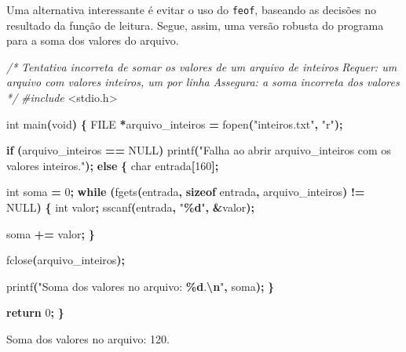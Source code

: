 \documentclass[
  11pt,
  a4paper,
]{scrbook}
\newenvironment{Shaded}{\begin{snugshade}}{\end{snugshade}}
\newcommand{\CommentTok}[1]{\textcolor[rgb]{0.56,0.35,0.01}{\textit{#1}}}
\newcommand{\ControlFlowTok}[1]{\textcolor[rgb]{0.13,0.29,0.53}{\textbf{#1}}}
\newcommand{\DataTypeTok}[1]{\textcolor[rgb]{0.13,0.29,0.53}{#1}}
\newcommand{\DecValTok}[1]{\textcolor[rgb]{0.00,0.00,0.81}{#1}}
\newcommand{\ImportTok}[1]{#1}
\newcommand{\KeywordTok}[1]{\textcolor[rgb]{0.13,0.29,0.53}{\textbf{#1}}}
\newcommand{\NormalTok}[1]{#1}
\newcommand{\OperatorTok}[1]{\textcolor[rgb]{0.81,0.36,0.00}{\textbf{#1}}}
\newcommand{\PreprocessorTok}[1]{\textcolor[rgb]{0.56,0.35,0.01}{\textit{#1}}}
\newcommand{\SpecialCharTok}[1]{\textcolor[rgb]{0.81,0.36,0.00}{\textbf{#1}}}
\newcommand{\StringTok}[1]{\textcolor[rgb]{0.31,0.60,0.02}{#1}}
\begin{document}
\begin{tcolorbox}
Uma alternativa interessante é evitar o uso do \texttt{feof}, baseando
as decisões no resultado da função de leitura. Segue, assim, uma versão
robusta do programa para a soma dos valores do arquivo.

\begin{Shaded}
\begin{Highlighting}[]
\CommentTok{/*}
\CommentTok{Tentativa incorreta de somar os valores de um arquivo de inteiros}
\CommentTok{Requer: um arquivo com valores inteiros, um por linha}
\CommentTok{Assegura: a soma incorreta dos valores}
\CommentTok{*/}
\PreprocessorTok{\#include }\ImportTok{\textless{}stdio.h\textgreater{}}

\DataTypeTok{int}\NormalTok{ main}\OperatorTok{(}\DataTypeTok{void}\OperatorTok{)} \OperatorTok{\{}
    \DataTypeTok{FILE} \OperatorTok{*}\NormalTok{arquivo\_inteiros }\OperatorTok{=}\NormalTok{ fopen}\OperatorTok{(}\StringTok{"inteiros.txt"}\OperatorTok{,} \StringTok{"r"}\OperatorTok{);}

    \ControlFlowTok{if} \OperatorTok{(}\NormalTok{arquivo\_inteiros }\OperatorTok{==}\NormalTok{ NULL}\OperatorTok{)}
\NormalTok{        printf}\OperatorTok{(}\StringTok{"Falha ao abrir arquivo\_inteiros com os valores inteiros."}\OperatorTok{);}
    \ControlFlowTok{else} \OperatorTok{\{}
        \DataTypeTok{char}\NormalTok{ entrada}\OperatorTok{[}\DecValTok{160}\OperatorTok{];}
        
        \DataTypeTok{int}\NormalTok{ soma }\OperatorTok{=} \DecValTok{0}\OperatorTok{;}
        \ControlFlowTok{while} \OperatorTok{(}\NormalTok{fgets}\OperatorTok{(}\NormalTok{entrada}\OperatorTok{,} \KeywordTok{sizeof}\NormalTok{ entrada}\OperatorTok{,}\NormalTok{ arquivo\_inteiros}\OperatorTok{)} \OperatorTok{!=}\NormalTok{ NULL}\OperatorTok{)} \OperatorTok{\{}
            \DataTypeTok{int}\NormalTok{ valor}\OperatorTok{;}
\NormalTok{            sscanf}\OperatorTok{(}\NormalTok{entrada}\OperatorTok{,} \StringTok{"}\SpecialCharTok{\%d}\StringTok{"}\OperatorTok{,} \OperatorTok{\&}\NormalTok{valor}\OperatorTok{);}

\NormalTok{            soma }\OperatorTok{+=}\NormalTok{ valor}\OperatorTok{;}
        \OperatorTok{\}}

\NormalTok{        fclose}\OperatorTok{(}\NormalTok{arquivo\_inteiros}\OperatorTok{);}

\NormalTok{        printf}\OperatorTok{(}\StringTok{"Soma dos valores no arquivo: }\SpecialCharTok{\%d}\StringTok{.}\SpecialCharTok{\textbackslash{}n}\StringTok{"}\OperatorTok{,}\NormalTok{ soma}\OperatorTok{);}
    \OperatorTok{\}}

    \ControlFlowTok{return} \DecValTok{0}\OperatorTok{;}
\OperatorTok{\}}
\end{Highlighting}
\end{Shaded}

\begin{Shaded}
\begin{Highlighting}[]
\NormalTok{Soma dos valores no arquivo: 120.}
\end{Highlighting}
\end{Shaded}

\end{tcolorbox}
\end{document}

